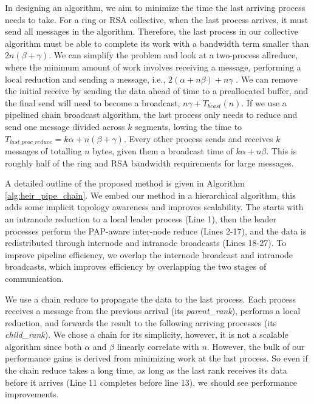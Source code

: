 In designing an algorithm, we aim to minimize the time the last arriving process needs to take.
For a ring or \gls{RSA} collective, when the last process arrives, it must send all messages in the algorithm.
Therefore, the last process in our collective algorithm must be able to complete its work with a bandwidth term smaller than $2n(\beta+\gamma)$. 
We can simplify the problem and look at a two-process allreduce, where the minimum amount of work involves receiving a message, performing a local reduction and sending a message, i.e., $2(\alpha+n\beta)+n\gamma$ \cite{Marendic2016Clairvoyant}.
We can remove the initial receive by sending the data ahead of time to a preallocated buffer, and the final send will need to become a broadcast, $n\gamma+T_{bcast}(n)$. 
If we use a pipelined chain broadcast algorithm, the last process only needs to reduce and send one message divided across $k$ segments, lowing the time to $T_{last\_proc\_reduce}=k\alpha+n(\beta+\gamma)$.
Every other process sends and receives $k$ messages of totalling $n$ bytes, given them a broadcast time of $k\alpha+n\beta$.
This is roughly half of the ring and \gls{RSA} bandwidth requirements for large messages.

A detailed outline of the proposed method is given in Algorithm \ref{alg:heir_pipe_chain}.
We embed our method in a hierarchical algorithm, this adds some implicit topology awareness and improves scalability.
The starts with an intranode reduction to a local leader process (Line 1), then the leader processes perform the \gls{PAP}-aware inter-node reduce (Lines 2-17), and the data is redistributed through internode and intranode broadcasts (Lines 18-27).
To improve pipeline efficiency, we overlap the internode broadcast and intranode broadcasts, which improves efficiency by overlapping the two stages of communication.



We use a chain reduce to propagate the data to the last process. 
Each process receives a message from the previous arrival (its \textit{parent\_rank}), performs a local reduction, and forwards the result to the following arriving processes (its \textit{child\_rank}).
We chose a chain for its simplicity, however, it is not a scalable algorithm since both $\alpha$ and $\beta$ linearly correlate with $n$.
However, the bulk of our performance gains is derived from minimizing work at the last process. 
So even if the chain reduce takes a long time, as long as the last rank receives its data before it arrives (Line 11 completes before line 13), we should see performance improvements.

